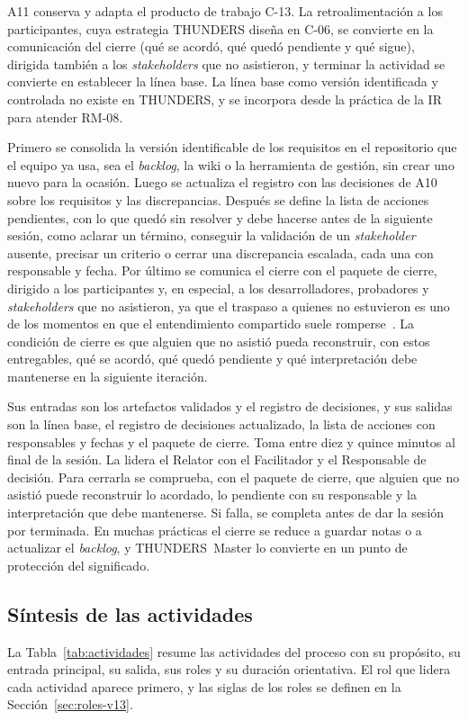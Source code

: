 \documentclass[12pt,letterpaper,oneside]{report}
\begin{document}
A11 conserva y adapta el producto de trabajo C-13. La retroalimentación a los
participantes, cuya estrategia THUNDERS diseña en C-06, se convierte en la
comunicación del cierre (qué se acordó, qué quedó pendiente y qué sigue),
dirigida también a los \textit{stakeholders} que no asistieron, y terminar la
actividad se convierte en establecer la línea base. La línea base como versión
identificada y controlada no existe en THUNDERS, y se incorpora desde la práctica
de la IR~\cite{iso29148} para atender RM-08.

Primero se consolida la versión identificable de los requisitos en el
repositorio que el equipo ya usa, sea el \textit{backlog}, la wiki o la
herramienta de gestión, sin crear uno nuevo para la ocasión. Luego se actualiza
el registro con las decisiones de A10 sobre los requisitos y las discrepancias.
Después se define la lista de acciones pendientes, con lo que quedó sin
resolver y debe hacerse antes de la siguiente sesión, como aclarar un término,
conseguir la validación de un \textit{stakeholder} ausente, precisar un criterio
o cerrar una discrepancia escalada, cada una con responsable y fecha. Por último
se comunica el cierre con el paquete de cierre, dirigido a los participantes y,
en especial, a los desarrolladores, probadores y \textit{stakeholders} que no
asistieron, ya que el traspaso a quienes no estuvieron es uno de los momentos
en que el entendimiento compartido suele romperse~\cite{fucci2022traceability}. La
condición de cierre es que alguien que no asistió pueda reconstruir,
con estos entregables, qué se acordó, qué quedó pendiente y qué interpretación
debe mantenerse en la siguiente iteración.

Sus entradas son los artefactos validados y el registro de decisiones, y sus
salidas son la línea base, el registro de decisiones actualizado, la lista de
acciones con responsables y fechas y el paquete de cierre. Toma entre diez y
quince minutos al final de la sesión. La lidera el Relator con el Facilitador y
el Responsable de decisión. Para cerrarla se comprueba, con el paquete de
cierre, que alguien que no asistió puede reconstruir lo acordado, lo pendiente
con su responsable y la interpretación que debe mantenerse. Si falla, se
completa antes de dar la sesión por terminada. En muchas prácticas el cierre se
reduce a guardar notas o a actualizar el \textit{backlog}, y THUNDERS~Master lo
convierte en un punto de protección del significado.

\subsection{Síntesis de las actividades}
La Tabla~\ref{tab:actividades} resume las actividades del proceso con su
propósito, su entrada principal, su salida, sus roles y su duración
orientativa. El rol que lidera cada actividad aparece primero, y las siglas de
los roles se definen en la Sección~\ref{sec:roles-v13}.
\end{document}
